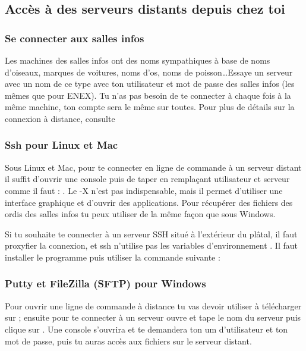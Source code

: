 \subsection{Accès à des serveurs distants depuis chez toi}

\subsubsection{Se connecter aux salles infos}

Les machines des salles infos ont des noms sympathiques à base de noms d'oiseaux, marques de voitures, noms d'os, noms de poisson\dots Essaye un serveur avec un nom de ce type avec ton utilisateur et mot de passe des salles infos (les mêmes que pour ENEX). Tu n'as pas besoin de te connecter à chaque fois à la même machine, ton compte sera le même sur toutes. Pour plus de détails sur la connexion à distance, consulte \newline {} 



\subsubsection{Ssh pour Linux et Mac}

Sous Linux et Mac, pour te connecter en ligne de commande à un serveur distant il suffit d'ouvrir une console puis de taper en remplaçant utilisateur et serveur comme il faut : . Le -X n'est pas indispensable, mais il permet d'utiliser une interface graphique et d'ouvrir des applications. Pour récupérer des fichiers des ordis des salles infos tu peux utiliser  de la même façon que sous Windows.

Si tu souhaite te connecter à un serveur SSH situé à l'extérieur du plâtal, il faut proxyfier la connexion, et ssh n'utilise pas les variables d'environnement . Il faut installer le programme  puis utiliser la commande suivante :

\newpage
\subsubsection{Putty et FileZilla (SFTP) pour Windows}

Pour ouvrir une ligne de commande à distance tu vas devoir utiliser  à télécharger sur  ;
ensuite pour te connecter à un serveur ouvre  et tape le nom du serveur puis clique sur .
Une console s'ouvrira et te demandera ton um d'utilisateur et ton mot de passe, puis tu auras accès aux fichiers sur le serveur distant.

